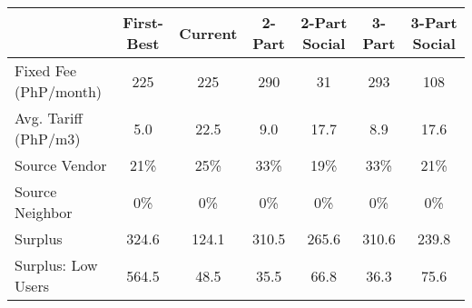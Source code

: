 \begin{tabular}{lcccccc}
  & First-Best & Current & 2-Part  & 2-Part Social  & 3-Part & 3-Part Social \\
\hline
\hline
Fixed Fee (PhP/month) &225&225&290&31&293&108\\
Avg. Tariff (PhP/m3) &5.0&22.5&9.0&17.7&8.9&17.6\\
Source Vendor &21\% &25\% &33\% &19\% &33\% &21\%\\
Source Neighbor &0\% &0\% &0\% &0\% &0\% &0\%\\
Surplus &324.6&124.1&310.5&265.6&310.6&239.8\\
Surplus: Low Users &564.5&48.5&35.5&66.8&36.3&75.6\\
\hline
\end{tabular}
